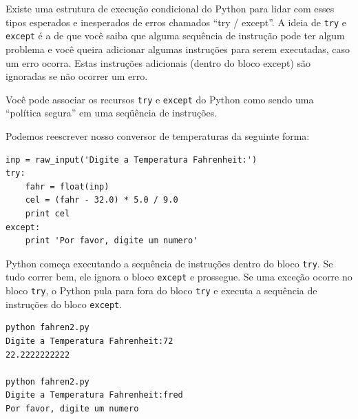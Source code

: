 Existe uma estrutura de execução condicional do
Python para lidar com esses tipos esperados e inesperados de
erros chamados ``try / except''. A ideia de {\tt try}
e {\tt except} é a de que você saiba que alguma sequência
de instrução pode ter algum problema e você queira
adicionar algumas instruções para serem executadas, caso um erro ocorra.
Estas instruções adicionais (dentro do bloco except) são ignoradas
se não ocorrer um erro.


Você pode associar os recursos {\tt try} e {\tt except}
do Python como sendo uma ``política segura'' em uma seqüência de
instruções.


Podemos reescrever nosso conversor de temperaturas da seguinte forma:

\beforeverb
\begin{verbatim}
inp = raw_input('Digite a Temperatura Fahrenheit:')
try:
    fahr = float(inp)
    cel = (fahr - 32.0) * 5.0 / 9.0
    print cel
except:
    print 'Por favor, digite um numero'
\end{verbatim}
\afterverb
%

Python começa executando a
sequência de instruções dentro do
bloco {\tt try}. Se tudo correr
bem, ele ignora o bloco {\tt except} e prossegue. Se uma
exceção ocorre no bloco {\tt try},
o Python pula para fora do bloco {\tt try} e
executa a sequência de instruções do bloco {\tt except}.


\beforeverb
\begin{verbatim}
python fahren2.py 
Digite a Temperatura Fahrenheit:72
22.2222222222

python fahren2.py 
Digite a Temperatura Fahrenheit:fred
Por favor, digite um numero
\end{verbatim}
\afterverb
%

